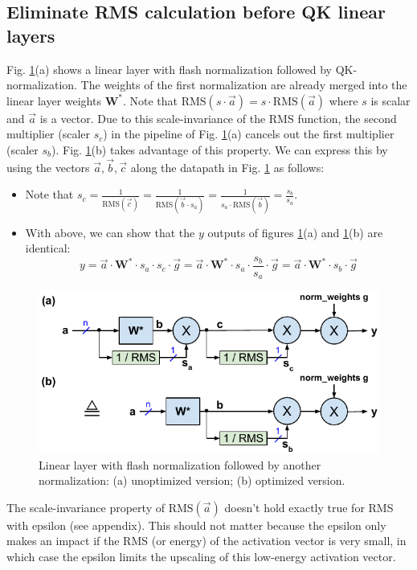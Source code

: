 \documentclass{article}
\numberwithin{equation}{section} %
\newcommand{\mat}[1]{\mathbf{#1}}     %
\newcommand{\RMS}[1]{\text{RMS}(#1)}  %
\def\rms{\text{RMS}(\vec{a})}         %
\def\W*{\mat{W}^\ast}                 %
\def\a{\vec{a}}                       %
\def\b{\vec{b}}                       %
\def\c{\vec{c}}                       %
\begin{document}
\subsection{Eliminate RMS calculation before QK linear layers}
Fig. \ref{fig6}(a) shows a linear layer with flash normalization followed by QK-normalization. The weights of the first normalization are already merged into the linear layer weights $\W*$. Note that $\RMS{s \cdot \a} = s \cdot \rms$ where $s$ is scalar and $\a$ is a vector. Due to this scale-invariance of the RMS function, the second multiplier (scaler $s_c$) in the pipeline of Fig. \ref{fig6}(a) cancels out the first multiplier (scaler $s_b$). Fig. \ref{fig6}(b) takes advantage of this property. We can express this by using the vectors $\a, \b, \c$ along the datapath in Fig. \ref{fig6} as follows:
\begin{itemize}[topsep=-1pt, itemsep=-1pt]
  \item Note that $s_c = \frac{1}{\RMS{\c}} = \frac{1}{\RMS{\b \cdot s_a}} = \frac{1}{s_a \cdot \RMS{\b}} = \frac{s_b}{s_a}$.
  \item With above, we can show that the $y$ outputs of figures \ref{fig6}(a) and \ref{fig6}(b) are identical:
    \begin{equation*}
      y = \a \cdot \W* \cdot s_a \cdot s_c \cdot \vec{g} = \a \cdot \W* \cdot s_a \cdot \frac{s_b}{s_a} \cdot \vec{g}
      = \a \cdot \W* \cdot s_b \cdot \vec{g}
    \end{equation*}
\end{itemize}

\begin{figure}[h!] \centering
  \includegraphics[scale=0.9]{figs/flash_fig6.pdf}
  \caption{Linear layer with flash normalization followed by another normalization: (a) unoptimized version; (b) optimized version.}
\label{fig6} \end{figure}

The scale-invariance property of $\rms$ doesn’t hold exactly true for RMS with epsilon (see appendix). This should not matter because the epsilon only makes an impact if the RMS (or energy) of the activation vector is very small, in which case the epsilon limits the upscaling of this low-energy activation vector.
\end{document}
